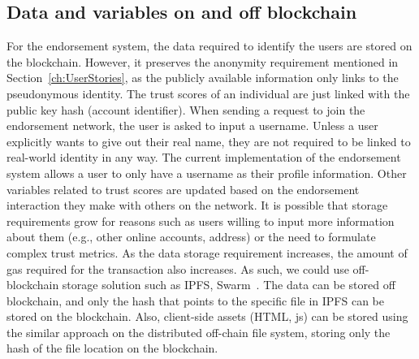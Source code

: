 \subsection{Data and variables on and off blockchain}
For the endorsement system, the data required to identify the users are stored
on the blockchain. However, it preserves the anonymity requirement mentioned in
Section~\ref{ch:UserStories}, as the publicly available information only links
to the pseudonymous identity. The trust scores of an individual are just linked
with the public key hash (account identifier). When sending a request to join
the endorsement network, the user is asked to input a username. Unless a user
explicitly wants to give out their real name, they are not required to be
linked to real-world identity in any way. The current implementation of the
endorsement system allows a user to only have a username as their profile
information. Other variables related to trust scores are updated based on the
endorsement interaction they make with others on the network. It is possible
that storage requirements grow for reasons such as users willing to input more
information about them (e.g., other online accounts, address) or the need to
formulate complex trust metrics. As the data storage requirement increases, the
amount of gas required for the transaction also increases. As such, we could
use off-blockchain storage solution such as IPFS, Swarm~\cite{benet2014ipfs}.
The data can be stored off blockchain, and only the hash that points to the
specific file in IPFS can be stored on the blockchain. Also, client-side assets
(HTML, js) can be stored using the similar approach on the distributed
off-chain file system, storing only the hash of the file location on the
blockchain. 

